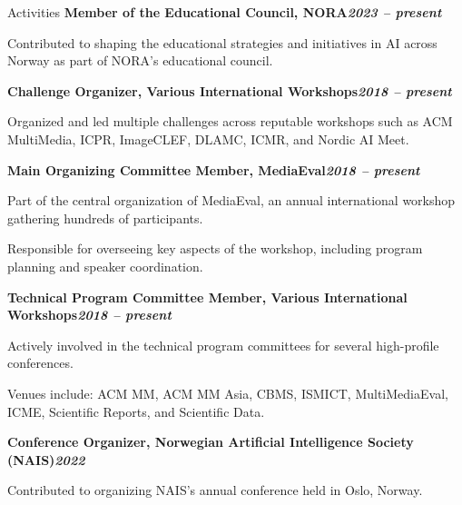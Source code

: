 \begin{rubric}{Activities}
\entry*[]%
\textbf{Member of the Educational Council, NORA\hfill\textit{2023 -- present}} \par
\begin{compactitem}
    \item Contributed to shaping the educational strategies and initiatives in AI across Norway as part of NORA's educational council.
    \vspace{-12pt}
\end{compactitem}
% 
\entry*[]%
\textbf{Challenge Organizer, Various International Workshops\hfill\textit{2018 -- present}} \par
\begin{compactitem}
    \item Organized and led multiple challenges across reputable workshops such as ACM MultiMedia, ICPR, ImageCLEF, DLAMC, ICMR, and Nordic AI Meet. 
    \vspace{-12pt}
\end{compactitem}
%
\entry*[]%
\textbf{Main Organizing Committee Member, MediaEval\hfill\textit{2018 -- present}} \par
\begin{compactitem}
    \item Part of the central organization of MediaEval, an annual international workshop gathering hundreds of participants.
    \item Responsible for overseeing key aspects of the workshop, including program planning and speaker coordination.
    \vspace{-12pt}
\end{compactitem}
% 
\entry*[]%
\textbf{Technical Program Committee Member, Various International Workshops\hfill\textit{2018 -- present}} \par
\begin{compactitem}
    \item Actively involved in the technical program committees for several high-profile conferences.
    \item Venues include: ACM MM, ACM MM Asia, CBMS, ISMICT, MultiMediaEval, ICME, Scientific Reports, and Scientific Data.
    \vspace{-12pt}
\end{compactitem}
%
\entry*[]%
\textbf{Conference Organizer, Norwegian Artificial Intelligence Society (NAIS)\hfill\textit{2022}} \par
\begin{compactitem}
    \item Contributed to organizing NAIS's annual conference held in Oslo, Norway.

\end{compactitem}
\end{rubric}
